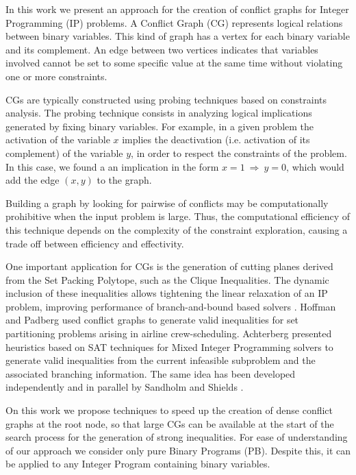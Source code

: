 \documentclass{endm}
\begin{document}
In this work we present an approach for the creation of conflict graphs for Integer Programming (IP) problems. A Conflict Graph (CG) represents logical relations between binary variables. This kind of graph has a vertex for each binary variable and its complement. An edge between two vertices indicates that variables involved cannot be set to some specific value at the same time without violating one or more constraints.

CGs are typically constructed using probing techniques \cite{Borndorfer1998} based on constraints analysis. The probing technique consists in analyzing logical implications generated by fixing binary variables. For example, in a given problem the activation of the variable $x$ implies the deactivation (i.e. activation of its complement) of the variable $y$, in order to respect the constraints of the problem. In this case, we found a an implication in the form $x = 1 \ \Rightarrow \ y = 0$, which would add the edge $(x,y)$ to the graph.

Building a graph by looking for pairwise of conflicts may be computationally prohibitive when the input problem is large. Thus, the computational efficiency of this technique depends on the complexity of the constraint exploration, causing a trade off between efficiency and effectivity. 

One important application for CGs is the generation of cutting planes derived from the Set Packing Polytope\cite{Padberg1973}, such as the Clique Inequalities. The dynamic inclusion of these inequalities allows tightening the linear relaxation of an IP problem, improving performance of branch-and-bound based solvers \cite{atamturk}. Hoffman and Padberg \cite{hoffman} used conflict graphs to generate valid inequalities for set partitioning problems arising in airline crew-scheduling. Achterberg \cite{achterberg} presented heuristics based on SAT techniques for Mixed Integer Programming solvers to generate valid inequalities from the current infeasible subproblem and the associated branching information. The same idea has been developed independently and in parallel by Sandholm and Shields \cite{sandholm}.  

On this work we propose techniques to speed up the creation of dense conflict graphs at the root node, so that large CGs can be available at the start of the search process for the generation of strong inequalities. For ease of understanding of our approach we consider only pure Binary Programs (PB). Despite this, it can be applied to any Integer Program containing binary variables. 
\end{document}
